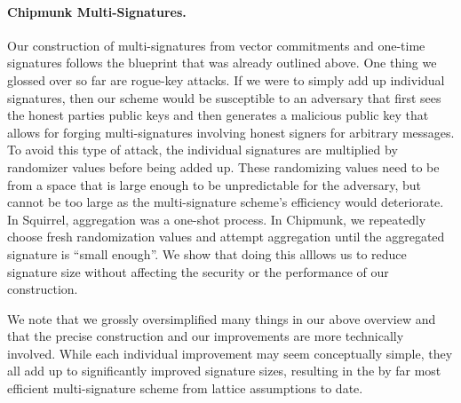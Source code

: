 \paragraph{Chipmunk Multi-Signatures.}
Our construction of multi-signatures from vector commitments and one-time signatures follows the blueprint that was already outlined above.
One thing we glossed over so far are rogue-key attacks.
If we were to simply add up individual signatures, then our scheme would be susceptible to an adversary that first sees the honest parties public keys and then generates a malicious public key that allows for forging multi-signatures involving honest signers for arbitrary messages.
To avoid this type of attack, the individual signatures are multiplied by randomizer values before being added up.
These randomizing values need to be from a space that is large enough to be unpredictable for the adversary, but cannot be too large as the multi-signature scheme's efficiency would deteriorate.
In Squirrel, aggregation was a one-shot process.
In Chipmunk, we repeatedly choose fresh randomization values and attempt aggregation until the aggregated signature is ``small enough''.
We show that doing this alllows us to reduce signature size without affecting the security or the performance of our construction.



We note that we grossly oversimplified many things in our above overview and that the precise construction and our improvements are more technically involved.
While each individual improvement may seem conceptually simple, they all add up to significantly improved signature sizes, resulting in the by far most efficient multi-signature scheme from lattice assumptions to date.




